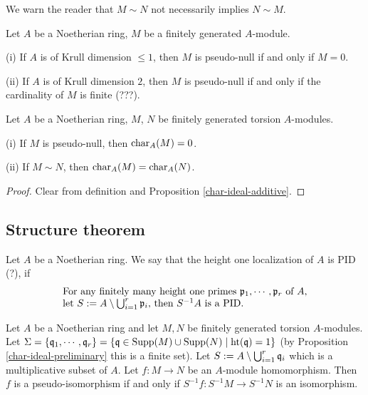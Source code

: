 \begin{remark}
We warn the reader that $M\sim N$ not necessarily implies $N\sim M$.
\end{remark}

\begin{prop}
\label{pseudo-null-criterion}
Let $A$ be a Noetherian ring, $M$ be a finitely generated $A$-module.

{\rm(i)} If $A$ is of Krull dimension $\leq 1$, then $M$ is pseudo-null
if and only if $M=0$.

{\rm(ii)} If $A$ is of Krull dimension $2$, then $M$ is pseudo-null
if and only if the cardinality of $M$ is finite (???).
\end{prop}

\begin{prop}
\label{pseudo-null-char-ideal}
Let $A$ be a Noetherian ring, $M$, $N$ be finitely generated torsion $A$-modules.

{\rm(i)} If $M$ is pseudo-null, then $\operatorname{char}_A(M)=0$.

{\rm(ii)} If $M\sim N$, then $\operatorname{char}_A(M)=\operatorname{char}_A(N)$.
\end{prop}

\begin{proof}
Clear from definition and Proposition \ref{char-ideal-additive}.
\end{proof}

\subsection{Structure theorem}

\begin{definition}
\label{ht-1-localization-is-PID}
Let $A$ be a Noetherian ring.
We say that the height one localization of $A$ is PID (?), if
\begin{equation}
\label{eqn:ht-1-localization-is-PID}
\begin{array}{l}
\text{For any finitely many height one primes ${\mathfrak{p}}_1,\cdots,{\mathfrak{p}}_r$ of $A$,}\\
\text{let $S:=A\setminus\bigcup_{i=1}^r{\mathfrak{p}}_i$, then $S^{-1}A$ is a PID.}
\end{array}
\end{equation}
\end{definition}

\begin{lem}
\label{pis-iff}
Let $A$ be a Noetherian ring and let
$M,N$ be finitely generated torsion $A$-modules.
Let $\Sigma=\{{\mathfrak{q}}_1,\cdots,{\mathfrak{q}}_r\}
=\{{\mathfrak{q}}\in{\mathrm{Supp}}(M)\cup{\mathrm{Supp}}(N)\mid{\mathrm{ht}}({\mathfrak{q}})=1\}$
(by Proposition \ref{char-ideal-preliminary} this is a finite set).
Let $S:=A\setminus\bigcup_{i=1}^r{\mathfrak{q}}_i$ which is a multiplicative subset of $A$.
Let $f:M\to N$ be an $A$-module homomorphism.
Then $f$ is a pseudo-isomorphism if and only if $S^{-1}f:S^{-1}M\to S^{-1}N$
is an isomorphism.
\end{lem}

